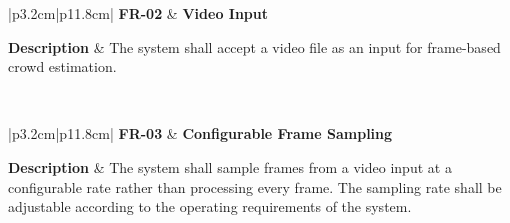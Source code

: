 
\begin{table}[H]
	\centering
	\renewcommand{\arraystretch}{1.25}
	\begin{tabular}{|p{3.2cm}|p{11.8cm}|}
		\hline
		\textbf{FR-02} &
		\textbf{Video Input} \\ \hline
		
		\textbf{Description} &
		The system shall accept a video file as an input for frame-based crowd estimation. \\ \hline
		
		 \\ \hline
	\end{tabular}
	\caption{Functional requirement for video input.}
	\label{tab:fr02}
\end{table}



\begin{table}[H]
	\centering
	\renewcommand{\arraystretch}{1.25}
	\begin{tabular}{|p{3.2cm}|p{11.8cm}|}
		\hline
		\textbf{FR-03} &
		\textbf{Configurable Frame Sampling} \\ \hline
		
		\textbf{Description} &
		The system shall sample frames from a video input at a configurable rate rather than processing every frame. The sampling rate shall be adjustable according to the operating requirements of the system. \\ \hline
		
		 \\ \hline
	\end{tabular}
	\caption{Functional requirement for configurable frame sampling.}
	\label{tab:fr03}
\end{table}


